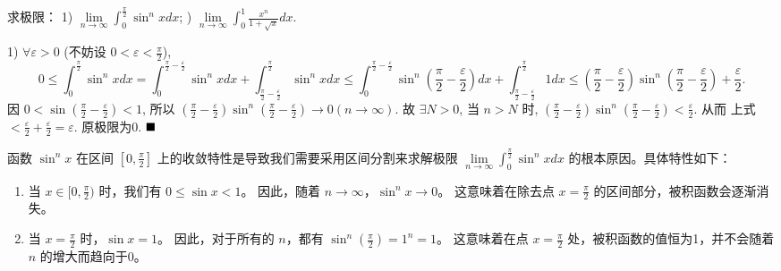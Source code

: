 \documentclass[lang=cn,newtx,10pt,scheme=chinese]{elegantbook}
\begin{document}
\begin{example}[$\bigstar$]\label{eg4.1.4}
求极限：
1) $\lim\limits_{n \to \infty} \int_{0}^{\frac{\pi}{2}} \sin^{n} x dx$;  ) $\lim\limits_{n \to \infty} \int_{0}^{1} \frac{x^{n}}{1 + \sqrt{x}} dx$.
\end{example}
\begin{solution}
    1) $\forall \varepsilon > 0$ (不妨设 $0 < \varepsilon < \frac{\pi}{2}$),
    $$0 \leqslant \int_{0}^{\frac{\pi}{2}} \sin^{n} x dx = \int_{0}^{\frac{\pi}{2} - \frac{\varepsilon}{2}} \sin^{n} x dx + \int_{\frac{\pi}{2} - \frac{\varepsilon}{2}}^{\frac{\pi}{2}} \sin^{n} x dx \leqslant \int_{0}^{\frac{\pi}{2} - \frac{\varepsilon}{2}} \sin^{n} \left(\frac{\pi}{2} - \frac{\varepsilon}{2}\right) dx + \int_{\frac{\pi}{2} - \frac{\varepsilon}{2}}^{\frac{\pi}{2}} 1 dx \leqslant \left(\frac{\pi}{2} - \frac{\varepsilon}{2}\right) \sin^{n} \left(\frac{\pi}{2} - \frac{\varepsilon}{2}\right) + \frac{\varepsilon}{2}.$$
    因 $0 < \sin\left(\frac{\pi}{2} - \frac{\varepsilon}{2}\right) < 1$, 所以 $\left(\frac{\pi}{2} - \frac{\varepsilon}{2}\right) \sin^{n} \left(\frac{\pi}{2} - \frac{\varepsilon}{2}\right) \to 0 (n \to \infty)$. 故 $\exists N > 0$, 当 $n > N$ 时, $\left(\frac{\pi}{2} - \frac{\varepsilon}{2}\right) \sin^{n} \left(\frac{\pi}{2} - \frac{\varepsilon}{2}\right) < \frac{\varepsilon}{2}$. 从而
    上式 $< \frac{\varepsilon}{2} + \frac{\varepsilon}{2} = \varepsilon$.
    原极限为0. $\hfill \blacksquare$

\begin{remark}
        函数 $\sin^n x$ 在区间 $[0, \frac{\pi}{2}]$ 上的收敛特性是导致我们需要采用区间分割来求解极限 $\lim\limits_{n \to \infty} \int_{0}^{\frac{\pi}{2}} \sin^{n} x dx$ 的根本原因。具体特性如下：

    \begin{enumerate}
        \item 当 $x \in [0, \frac{\pi}{2})$ 时，我们有 $0 \le \sin x < 1$。
        因此，随着 $n \to \infty$，$\sin^n x \to 0$。
        这意味着在除去点 $x=\frac{\pi}{2}$ 的区间部分，被积函数会逐渐消失。

        \item 当 $x = \frac{\pi}{2}$ 时，$\sin x = 1$。
        因此，对于所有的 $n$，都有 $\sin^n \left(\frac{\pi}{2}\right) = 1^n = 1$。
        这意味着在点 $x=\frac{\pi}{2}$ 处，被积函数的值恒为1，并不会随着 $n$ 的增大而趋向于0。
    \end{enumerate}


\end{remark}
\end{solution}
\end{document}
